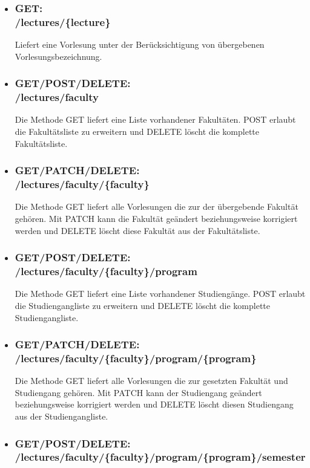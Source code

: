 \begin{itemize}
\item \subsubsection{GET:\\ /lectures/\{lecture\}} 
Liefert eine Vorlesung unter der Berücksichtigung von übergebenen Vorlesungsbezeichnung.
\item \subsubsection{GET/POST/DELETE:\\ /lectures/faculty} 
Die Methode GET liefert eine Liste vorhandener Fakultäten. POST erlaubt die Fakultätsliste zu erweitern und DELETE löscht die komplette Fakultätsliste.
\item \subsubsection{GET/PATCH/DELETE:\\ /lectures/faculty/\{faculty\}} 
Die Methode GET liefert alle Vorlesungen die zur der übergebende Fakultät gehören. Mit PATCH kann die Fakultät geändert beziehungsweise korrigiert werden und DELETE löscht diese Fakultät aus der Fakultätsliste.
\item \subsubsection{GET/POST/DELETE:\\ /lectures/faculty/\{faculty\}/program} 
Die Methode GET liefert eine Liste vorhandener Studiengänge. POST erlaubt die Studiengangliste zu erweitern und DELETE löscht die komplette Studiengangliste.
\item \subsubsection{GET/PATCH/DELETE:\\ /lectures/faculty/\{faculty\}/program/\{program\}} 
Die Methode GET liefert alle Vorlesungen die zur gesetzten Fakultät und Studiengang gehören. Mit PATCH kann der Studiengang geändert beziehungsweise korrigiert werden und DELETE löscht diesen Studiengang aus der Studiengangliste.
\item \subsubsection{GET/POST/DELETE:\\ /lectures/faculty/\{faculty\}/program/\{program\}/semester} 

\end{itemize}
